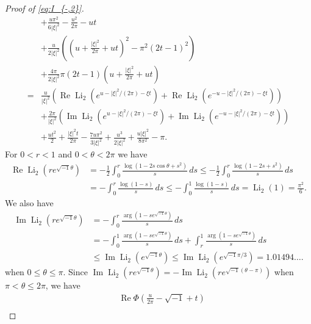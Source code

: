 \documentclass[a4paper]{amsart}
\theoremstyle{plain}
\theoremstyle{definition}
\theoremstyle{remark}
\newcommand{\Li}{\operatorname{Li}}
\renewcommand{\Re}{\operatorname{Re}}
\renewcommand{\Im}{\operatorname{Im}}
\numberwithin{equation}{section}
\begin{document}
\begin{proof}[Proof of \eqref{eq:I_{-,2}}]
\begin{equation*}
\begin{split}
  &
  +\frac{u\pi^2}{6|\xi|^2}-\frac{u^2}{2\pi}-ut
  \\
  &
  +\frac{u}{2|\xi|^2}
  \left(
    \left(
    u+\frac{|\xi|^2}{2\pi}+ut
    \right)^2
    -
    \pi^2(2t-1)^2
  \right)
  \\
  &
  +
  \frac{4\pi}{2|\xi|^2}
  \pi(2t-1)
  \left(
    u+\frac{|\xi|^2}{2\pi}+ut
  \right)
  \\
  =&
  \frac{u}{|\xi|^2}
  \left(
    \Re\Li_2(e^{u-|\xi|^2/(2\pi)-\xi t})
    +
    \Re\Li_2(e^{-u-|\xi|^2/(2\pi)-\xi t})
  \right)
  \\
  &
  +
  \frac{2\pi}{|\xi|^2}
  \left(
    \Im\Li_2(e^{u-|\xi|^2/(2\pi)-\xi t})
    +
    \Im\Li_2(e^{-u-|\xi|^2/(2\pi)-\xi t})
  \right)
  \\
  &
  +\frac{ut^2}{2}
  +\frac{|\xi|^2t}{2\pi}
  -\frac{7u\pi^2}{3|\xi|^2}
  +\frac{u^3}{2|\xi|^2}
  +\frac{u|\xi|^2}{8\pi^2}
  -\pi.
\end{split}
\end{equation*}
For $0<r<1$ and $0<\theta<2\pi$ we have
\begin{equation*}
\begin{split}
  \Re\Li_2(re^{\sqrt{-1}\theta})
  &=
  -\frac{1}{2}
  \int_{0}^{r}
  \frac{\log(1-2s\cos\theta+s^2)}{s}\,ds
  \le
  -\frac{1}{2}
  \int_{0}^{r}
  \frac{\log(1-2s+s^2)}{s}\,ds
  \\
  &=
  -\int_{0}^{r}\frac{\log(1-s)}{s}\,ds
  \le
  -\int_{0}^{1}\frac{\log(1-s)}{s}\,ds
  =
  \Li_2(1)
  =
  \frac{\pi^2}{6}.
\end{split}
\end{equation*}
We also have
\begin{equation*}
\begin{split}
  \Im\Li_2(re^{\sqrt{-1}\theta})
  &=
  -\int_{0}^{r}
  \frac{\arg(1-se^{\sqrt{-1}\theta})}{s}\,ds
  \\
  &=
  -\int_{0}^{1}\frac{\arg(1-se^{\sqrt{-1}\theta})}{s}\,ds
  +
  \int_{r}^{1}
  \frac{\arg(1-se^{\sqrt{-1}\theta})}{s}\,ds
  \\
  &\le
  \Im\Li_2(e^{\sqrt{-1}\theta})
  \le
  \Im\Li_2(e^{\sqrt{-1}\pi/3})
  =
  1.01494\dots.
\end{split}
\end{equation*}
when $0\le\theta\le\pi$.
Since $\Im\Li_2(re^{\sqrt{-1}\theta})=-\Im\Li_2(re^{\sqrt{-1}(\theta-\pi)})$ when $\pi<\theta\le2\pi$, we have
\begin{equation*}
\begin{split}
  &\Re\Phi\left(\frac{u}{2\pi}-\sqrt{-1}+t\right)
  \\

\end{split}
\end{equation*}
\end{proof}
\end{document}
